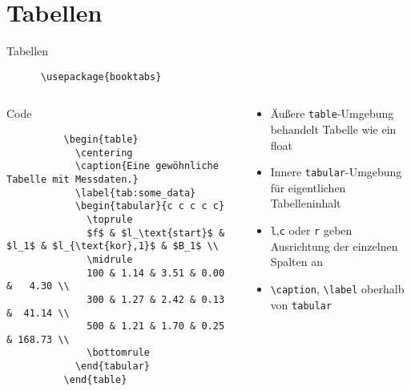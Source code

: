 \section{Tabellen}

\begin{frame}[fragile]{Tabellen}
  \begin{Packages}
    \begin{lstlisting}
      \usepackage{booktabs}
    \end{lstlisting}
  \end{Packages}
  \begin{columns}[onlytextwidth, t]
    \begin{column}{0.60\textwidth}
      \fontsize{8}{6}
      \begin{block}{Code}
        \begin{lstlisting}
          \begin{table}
            \centering
            \caption{Eine gewöhnliche Tabelle mit Messdaten.}
            \label{tab:some_data}
            \begin{tabular}{c c c c c}
              \toprule
              $f$ & $l_\text{start}$ & $l_1$ & $l_{\text{kor},1}$ & $B_1$ \\
              \midrule
              100 & 1.14 & 3.51 & 0.00 &   4.30 \\
              300 & 1.27 & 2.42 & 0.13 &  41.14 \\
              500 & 1.21 & 1.70 & 0.25 & 168.73 \\
              \bottomrule
            \end{tabular}
          \end{table}
        \end{lstlisting}
      \end{block}
    \end{column}
    \begin{column}{0.36\textwidth}
      \begin{itemize}
        \item Äußere \texttt{table}-Umgebung behandelt Tabelle wie ein float
        \item Innere \texttt{tabular}-Umgebung für eigentlichen Tabelleninhalt
        \item \texttt{l},\texttt{c} oder \texttt{r} geben Ausrichtung der einzelnen Spalten an
        \item \lstinline+\caption+, \lstinline+\label+ oberhalb von \texttt{tabular}
      \end{itemize}
    \end{column}
  \end{columns}
\end{frame}

